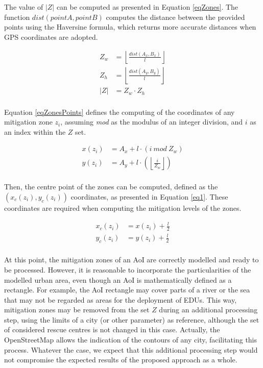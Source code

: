 \begin{refsection}
The value of $|Z|$ can be computed as presented in Equation \ref{eqZones}. The function $dist(pointA, pointB)$ computes the distance between the provided points using the Haversine formula, which returns more accurate distances when GPS coordinates are adopted. 

\begin{equation}
  \begin{split}
    \displaystyle Z_w &= \left\lfloor \frac{dist(A_x,B_x)}{l} \right\rfloor\\
    \displaystyle Z_h &= \left\lfloor \frac{dist(A_y,B_y)}{l} \right\rfloor\\
    \displaystyle \lvert Z \rvert &= Z_w \cdot Z_h\\
  \end{split}	
  \label{eqZones}
\end{equation}

Equation \ref{eqZonesPoints} defines the computing of the coordinates of any mitigation zone $z_i$, assuming \textit{mod} as the modulus of an integer division, and $i$ as an index within the $Z$ set.

\begin{equation}
  \begin{split}
    \displaystyle x(z_i) &= A_x + l \cdot (i\ mod\ Z_w)\\
    \displaystyle y(z_i) &= A_y + l \cdot \left(\left\lfloor \frac{i}{Z_w} \right\rfloor\right)\\
  \end{split}	
  \label{eqZonesPoints}
\end{equation}

Then, the centre point of the zones can be computed, defined as the $(x_c(z_i),y_c(z_i))$ coordinates, as presented in Equation \ref{eq1}. These coordinates are required when computing the mitigation levels of the zones.

\begin{equation}
  \begin{split}
    \displaystyle x_c(z_i) &= x(z_i) + \frac{l}{2}\\
    \displaystyle y_c(z_i) &= y(z_i) + \frac{l}{2}\\
  \end{split}	
  \label{eq1}
\end{equation}

At this point, the mitigation zones of an AoI are correctly modelled and ready to be processed. However, it is reasonable to incorporate the particularities of the modelled urban area, even though an AoI is mathematically defined as a rectangle. For example, the AoI rectangle may cover parts of a river or the sea that may not be regarded as areas for the deployment of EDUs. This way, mitigation zones may be removed from the set $Z$ during an additional processing step, using the limits of a city (or other parameter) as reference, although the set of considered rescue centres is not changed in this case. Actually, the OpenStreetMap allows the indication of the contours of any city, facilitating this process. Whatever the case, we expect that this additional processing step would not compromise the expected results of the proposed approach as a whole.


\end{refsection}
